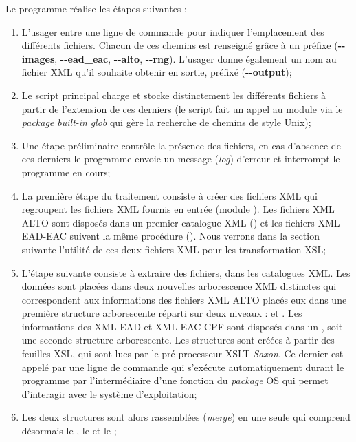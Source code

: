 Le programme réalise les étapes suivantes :
\begin{enumerate}
    \item L'usager entre une ligne de commande pour indiquer l'emplacement des différents fichiers. Chacun de ces chemins est renseigné grâce à un préfixe (\textbf{-{}-images}, \textbf{-{}-ead\_eac}, \textbf{-{}-alto}, \textbf{-{}-rng}). L'usager donne également un nom au fichier XML qu'il souhaite obtenir en sortie, préfixé (\textbf{-{}-output});
    \item Le script principal charge et stocke distinctement les différents fichiers à partir de l'extension de ces derniers (le script fait un appel au module  via le \textit{package built-in} \textit{glob} qui gère la recherche de chemins de style Unix);
    \item Une étape préliminaire contrôle la présence des fichiers, en cas d'absence de ces derniers le programme envoie un message (\textit{log}) d'erreur et interrompt le programme en cours;
    \item La première étape du traitement consiste à créer des fichiers XML  qui regroupent les fichiers XML fournis en entrée (module ). Les fichiers XML ALTO sont disposés dans un premier catalogue XML () et les fichiers XML EAD-EAC suivent la même procédure (). Nous verrons dans la section suivante l'utilité de ces deux fichiers XML pour les transformation XSL;
    \item L'étape suivante consiste à extraire des fichiers, dans les catalogues XML. Les données sont placées dans deux nouvelles arborescence XML distinctes qui correspondent aux informations des fichiers XML ALTO placés eux dans une première structure arborescente réparti sur deux niveaux :  et . Les informations des XML EAD et XML EAC-CPF sont disposés dans un , soit une seconde structure arborescente. Les structures sont créées à partir des feuilles XSL, qui sont lues par le pré-processeur XSLT \textit{Saxon}. Ce dernier est appelé par une ligne de commande qui s'exécute automatiquement durant le programme par l'intermédiaire d'une fonction du \textit{package} OS qui permet d'interagir avec le système d'exploitation;
    \item Les deux structures sont alors rassemblées (\textit{merge}) en une seule qui comprend désormais le , le  et le ;

\end{enumerate}
